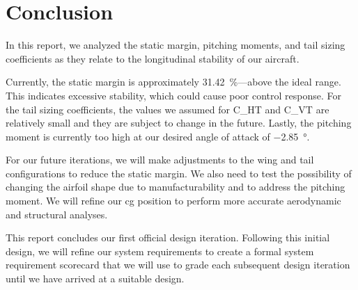 \chapter{Conclusion}\label{cp:conclusion}

In this report, we analyzed the static margin, pitching moments, and tail sizing coefficients as they relate to the longitudinal stability of our aircraft.

Currently, the static margin is approximately \qty{31.42}{\percent}—above the ideal range. This indicates excessive stability, which could cause poor control response. For the tail sizing coefficients, the values we assumed for \gls{C_HT} and \gls{C_VT} are relatively small and they are subject to change in the future. Lastly, the pitching moment is currently too high at our desired angle of attack of \qty{-2.85}{\degree}.

For our future iterations, we will make adjustments to the wing and tail configurations to reduce the static margin. We also need to test the possibility of changing the airfoil shape due to manufacturability and to address the pitching moment. We will refine our \acrshort{cg} position to perform more accurate aerodynamic and structural analyses.

This report concludes our first official design iteration. Following this initial design, we will refine our system requirements to create a formal system requirement scorecard that we will use to grade each subsequent design iteration until we have arrived at a suitable design.
